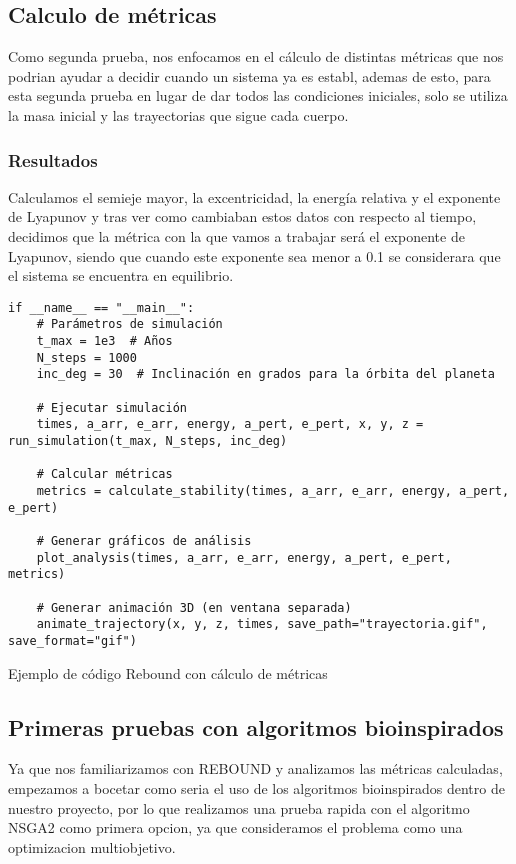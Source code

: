 \subsection{Calculo de métricas}
Como segunda prueba, nos enfocamos en el cálculo de distintas métricas que nos podrian ayudar a decidir cuando un sistema ya es establ, ademas de esto, para esta segunda prueba en lugar de dar todos las condiciones iniciales, solo se utiliza la masa inicial y las trayectorias que sigue cada cuerpo.

\subsubsection{Resultados}
Calculamos el semieje mayor, la excentricidad, la energía relativa y el exponente de Lyapunov y tras ver como cambiaban estos datos con respecto al tiempo, decidimos que la métrica con la que vamos a trabajar será el exponente de Lyapunov, siendo que cuando este exponente sea menor a 0.1 se considerara que el sistema se encuentra en equilibrio.

\begin{listing}[H]
\begin{verbatim}
if __name__ == "__main__":
    # Parámetros de simulación
    t_max = 1e3  # Años
    N_steps = 1000
    inc_deg = 30  # Inclinación en grados para la órbita del planeta

    # Ejecutar simulación
    times, a_arr, e_arr, energy, a_pert, e_pert, x, y, z = run_simulation(t_max, N_steps, inc_deg)

    # Calcular métricas
    metrics = calculate_stability(times, a_arr, e_arr, energy, a_pert, e_pert)

    # Generar gráficos de análisis
    plot_analysis(times, a_arr, e_arr, energy, a_pert, e_pert, metrics)

    # Generar animación 3D (en ventana separada)
    animate_trajectory(x, y, z, times, save_path="trayectoria.gif", save_format="gif")
\end{verbatim}
\caption{Ejemplo de código Rebound con cálculo de métricas}
\label{lst:rebound_metrics}
\end{listing}


\subsection{Primeras pruebas con algoritmos bioinspirados}
Ya que nos familiarizamos con REBOUND y analizamos las métricas calculadas, empezamos a bocetar como seria el uso de los algoritmos bioinspirados dentro de nuestro proyecto, por lo que realizamos una prueba rapida con el algoritmo NSGA2 como primera opcion, ya que consideramos el problema como una optimizacion multiobjetivo.

